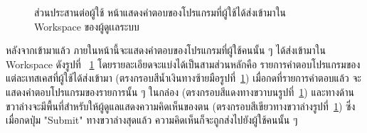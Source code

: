 \documentclass[12pt,oneside,openright,a4paper]{cpe-thai-project}
\begin{document}
    \begin{figure}[H]
    \centering
        \caption[ส่วนประสานต่อผู้ใช้ หน้าแสดงคำตอบของโปรแกรมที่ผู้ใช้ได้ส่งเข้ามาใน Workspace ของผู้ดูเเลระบบ]{ส่วนประสานต่อผู้ใช้ หน้าแสดงคำตอบของโปรแกรมที่ผู้ใช้ได้ส่งเข้ามาใน Workspace ของผู้ดูเเลระบบ}
        \label{fig:ui-org-code3}
    \end{figure}
    \begin{flushleft}
    หลังจากเข้ามาแล้ว ภายในหน้านี้จะแสดงคำตอบของโปรแกรมที่ผู้ใช้คนนั้น ๆ ได้ส่งเข้ามาใน Workspace ดังรูปที่ ~\ref{fig:ui-org-code3} โดยรายละเอียดจะแบ่งได้เป็นสามส่วนหลักคือ รายการคำตอบโปรแกรมของแต่ละเทสเคสที่ผู้ใช้ได้ส่งเข้ามา (ตรงกรอบสีน้ำเงินทางซ้ายมือรูปที่~\ref{fig:ui-org-code3}) เมื่อกดที่รายการคำตอบแล้ว จะแสดงคำตอบโปรแกรมของรายการนั้น ๆ ในกล่อง (ตรงกรอบสีแดงทางขวาบนรูปที่~\ref{fig:ui-org-code3}) และทางด้านขวาล่างจะมีพื้นที่สำหรับให้ผู้ดูแลแสดงความคิดเห็นของตน (ตรงกรอบสีเขียวทางขวาล่างรูปที่~\ref{fig:ui-org-code3}) ซึ่งเมื่อกดปุ่ม "Submit" ทางขวาล่างสุดแล้ว ความคิดเห็นก็จะถูกส่งไปยังผู้ใช้คนนั้น ๆ
    \end{flushleft}
    \pagebreak
\end{document}
